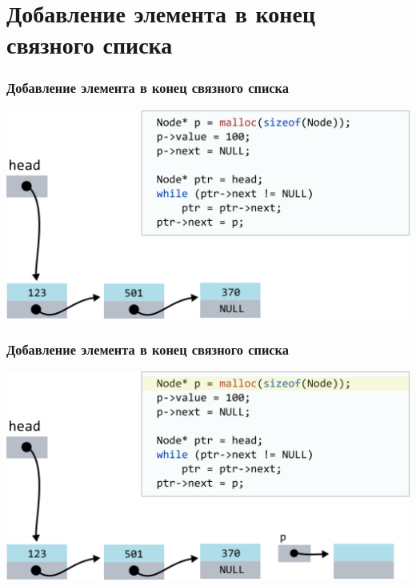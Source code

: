 \documentclass[10pt,pdf,hyperref={unicode}]{beamer}
\begin{document}
\section{Добавление элемента в конец связного списка}

\begin{frame}[fragile]
\frametitle{Добавление элемента в конец связного списка}
\begin{center}
\includegraphics[width=\imageSizeMult\linewidth]{../images/codelist/codelistf_insert1.png}
\end{center}
\end{frame}


\begin{frame}[fragile]
\frametitle{Добавление элемента в конец связного списка}
\begin{center}
\includegraphics[width=\imageSizeMult\linewidth]{../images/codelist/codelistf_insert2.png}
\end{center}
\end{frame}
\end{document}
